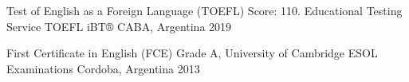 



\begin{cvhonors}

  \cvhonor
    {Test of English as a Foreign Language (TOEFL)} %
    {Score: 110. Educational Testing Service TOEFL iBT®} %
    {CABA, Argentina} %
    {2019} %

  \cvhonor
    {First Certificate in English (FCE)} %
    {Grade A, University of Cambridge ESOL Examinations} %
    {Cordoba, Argentina} %
    {2013} %

\end{cvhonors}

